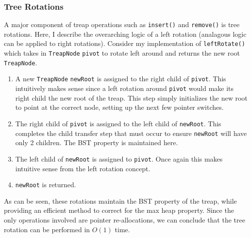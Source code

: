 \documentclass[11pt]{article}
\def\tt{\texttt}
\def\ins{\tt{insert()}}
\def\rem{\tt{remove()}}
\def\tn{\tt{TreapNode}}
\begin{document}
\subsubsection{Tree Rotations}
A major component of treap operations such as \ins{} and \rem{} is tree rotations. Here, I describe the overarching logic of a left rotation (analagous logic can be applied to right rotations). Consider my implementation of \tt{leftRotate()} which takes in \tn{} \tt{pivot} to rotate left around and returns the new root \tn{}.
\begin{enumerate}
	\item A new \tn{} \tt{newRoot} is assigned to the right child of \tt{pivot}. This intuitively makes sense since a left rotation around \tt{pivot} would make its right child the new root of the treap. This step simply initializes the new root to point at the correct node, setting up the next few pointer switches.
	\item The right child of \tt{pivot} is assigned to the left child of \tt{newRoot}. This completes the child transfer step that must occur to ensure \tt{newRoot} will have only 2 children. The BST property is maintained here. 
	\item The left child of \tt{newRoot} is assigned to \tt{pivot}. Once again this makes intuitive sense from the left rotation concept.
	\item \tt{newRoot} is returned.
\end{enumerate}
As can be seen, these rotations maintain the BST property of the treap, while providing an efficient method to correct for the max heap property. Since the only operations involved are pointer re-allocations, we can conclude that the tree rotation can be performed in $O(1)$ time.
\end{document}
